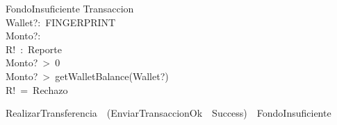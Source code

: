 \begin{schema}{FondoInsuficiente}
\Xi Transaccion\\
Wallet?:~FINGERPRINT\\
Monto?:~\integer\\
R!~:~Reporte\\
\where
Monto?~>~0\\
Monto?~>~getWalletBalance(Wallet?)\\
R!~=~Rechazo\\
\end{schema}
\begin{zed}
RealizarTransferencia~~(EnviarTransaccionOk~\land~Success)~\lor~FondoInsuficiente\\
\end{zed}
